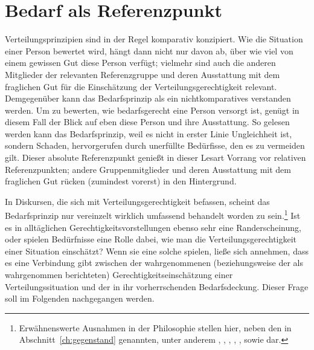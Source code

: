 \documentclass[justified,nobib,nohyper,symmetric,twoside]{tufte-book}
\begin{document}
\chapter{Bedarf als Referenzpunkt}\label{ch:referenzpunkt}
Verteilungsprinzipien sind in der Regel komparativ konzipiert.
Wie die Situation einer Person bewertet wird, hängt dann nicht nur davon ab, über wie viel von einem gewissen Gut diese Person verfügt; vielmehr sind auch die anderen Mitglieder der relevanten Referenzgruppe und deren Ausstattung mit dem fraglichen Gut für die Einschätzung der Verteilungsgerechtigkeit relevant.
Demgegenüber kann das Bedarfsprinzip als ein nichtkomparatives verstanden werden.
Um zu bewerten, wie bedarfsgerecht eine Person versorgt ist, genügt in diesem Fall der Blick auf eben diese Person und ihre Ausstattung.
So gelesen werden kann das Bedarfsprinzip, weil es nicht in erster Linie Ungleichheit ist, sondern Schaden, hervorgerufen durch unerfüllte Bedürfisse, den es zu vermeiden gilt.
Dieser absolute Referenzpunkt genießt in dieser Lesart Vorrang vor relativen Referenzpunkten; andere Gruppenmitglieder und deren Ausstattung mit dem fraglichen Gut rücken (zumindest vorerst) in den Hintergrund.

In Diskursen, die sich mit Verteilungsgerechtigkeit befassen, scheint das Bedarfsprinzip nur vereinzelt wirklich umfassend behandelt worden zu sein.\footnote{Erwähnenswerte Ausnahmen in der Philosophie stellen hier, neben den in Abschnitt~\ref{ch:gegenstand} genannten, unter anderem \citet{braybrooke_meeting_1987}, \citet{brock_necessary_1998}, \citet{doyal_theory_1991}, \citet{hamilton_political_2003}, \citet{reader_philosophy_2005}, \citet{thomson_needs_1987} sowie \citet{wiggins_needs_1998} dar.}
Ist es in alltäglichen Gerechtigkeitsvorstellungen ebenso sehr eine Randerscheinung, oder spielen Bedürfnisse eine Rolle dabei, wie man die Verteilungsgerechtigkeit einer Situation einschätzt?
Wenn sie eine solche spielen, ließe sich annehmen, dass es eine Verbindung gibt zwischen der wahrgenommenen (beziehungsweise der als wahrgenommen berichteten) Gerechtigkeitseinschätzung einer Verteilungssituation und der in ihr vorherrschenden Bedarfsdeckung.
Dieser Frage soll im Folgenden nachgegangen werden.
\end{document}
